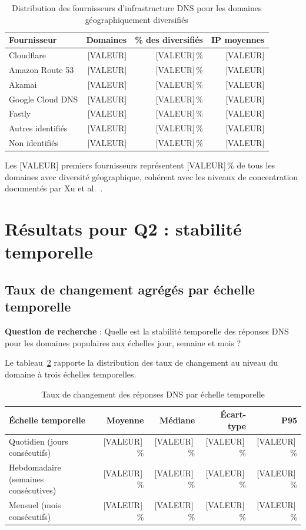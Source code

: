 \begin{table}[H]
\centering
\small
\begin{tabularx}{\linewidth}{X r r r}
\toprule
\textbf{Fournisseur} & \textbf{Domaines} & \textbf{\% des diversifiés} & \textbf{IP moyennes} \\
\midrule
Cloudflare & [VALEUR] & [VALEUR]\,\% & [VALEUR] \\
Amazon Route 53 & [VALEUR] & [VALEUR]\,\% & [VALEUR] \\
Akamai & [VALEUR] & [VALEUR]\,\% & [VALEUR] \\
Google Cloud DNS & [VALEUR] & [VALEUR]\,\% & [VALEUR] \\
Fastly & [VALEUR] & [VALEUR]\,\% & [VALEUR] \\
Autres identifiés & [VALEUR] & [VALEUR]\,\% & [VALEUR] \\
Non identifiés & [VALEUR] & [VALEUR]\,\% & [VALEUR] \\
\bottomrule
\end{tabularx}
\caption{Distribution des fournisseurs d'infrastructure DNS pour les domaines géographiquement diversifiés}
\label{tab:provider_distribution}
\end{table}

Les [VALEUR] premiers fournisseurs représentent [VALEUR]\,\% de tous les domaines avec diversité géographique, cohérent avec les niveaux de concentration documentés par Xu et al.~\cite{Xu2023}.

\bigskip
\section{Résultats pour Q2 : stabilité temporelle}
\label{sec:4.3}

\subsection{Taux de changement agrégés par échelle temporelle}
\label{subsec:4.3.1}

\textbf{Question de recherche} : Quelle est la stabilité temporelle des réponses DNS pour les domaines populaires aux échelles jour, semaine et mois ?

Le tableau~\ref{tab:change_rates} rapporte la distribution des taux de changement au niveau du domaine à trois échelles temporelles.

\begin{table}[H]
\centering
\small
\begin{tabularx}{\linewidth}{X r r r r}
\toprule
\textbf{Échelle temporelle} & \textbf{Moyenne} & \textbf{Médiane} & \textbf{Écart-type} & \textbf{P95} \\
\midrule
Quotidien (jours consécutifs) & [VALEUR]\,\% & [VALEUR]\,\% & [VALEUR]\,\% & [VALEUR]\,\% \\
Hebdomadaire (semaines consécutives) & [VALEUR]\,\% & [VALEUR]\,\% & [VALEUR]\,\% & [VALEUR]\,\% \\
Mensuel (mois consécutifs) & [VALEUR]\,\% & [VALEUR]\,\% & [VALEUR]\,\% & [VALEUR]\,\% \\
\bottomrule
\end{tabularx}
\caption{Taux de changement des réponses DNS par échelle temporelle}
\label{tab:change_rates}
\end{table}

